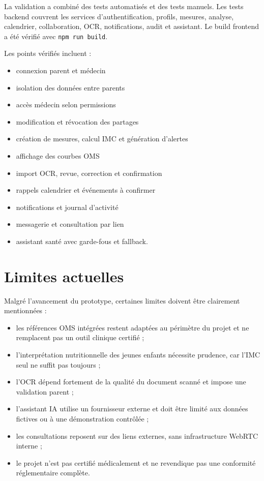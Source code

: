 La validation a combiné des tests automatisés et des tests manuels. Les tests backend couvrent les services d'authentification, profils, mesures, analyse, calendrier, collaboration, OCR, notifications, audit et assistant. Le build frontend a été vérifié avec \texttt{npm run build}.

Les points vérifiés incluent :

\begin{itemize}
    \item connexion parent et médecin 
    \item isolation des données entre parents 
    \item accès médecin selon permissions 
    \item modification et révocation des partages 
    \item création de mesures, calcul IMC et génération d'alertes 
    \item affichage des courbes OMS 
    \item import OCR, revue, correction et confirmation 
    \item rappels calendrier et événements à confirmer 
    \item notifications et journal d'activité 
    \item messagerie et consultation par lien 
    \item assistant santé avec garde-fous et fallback.
\end{itemize}

\section{Limites actuelles}

Malgré l'avancement du prototype, certaines limites doivent être clairement mentionnées :

\begin{itemize}
    \item les références OMS intégrées restent adaptées au périmètre du projet et ne remplacent pas un outil clinique certifié ;
    \item l'interprétation nutritionnelle des jeunes enfants nécessite prudence, car l'IMC seul ne suffit pas toujours ;
    \item l'OCR dépend fortement de la qualité du document scanné et impose une validation parent ;
    \item l'assistant IA utilise un fournisseur externe et doit être limité aux données fictives ou à une démonstration contrôlée ;
    \item les consultations reposent sur des liens externes, sans infrastructure WebRTC interne ;
    \item le projet n'est pas certifié médicalement et ne revendique pas une conformité réglementaire complète.
\end{itemize}

